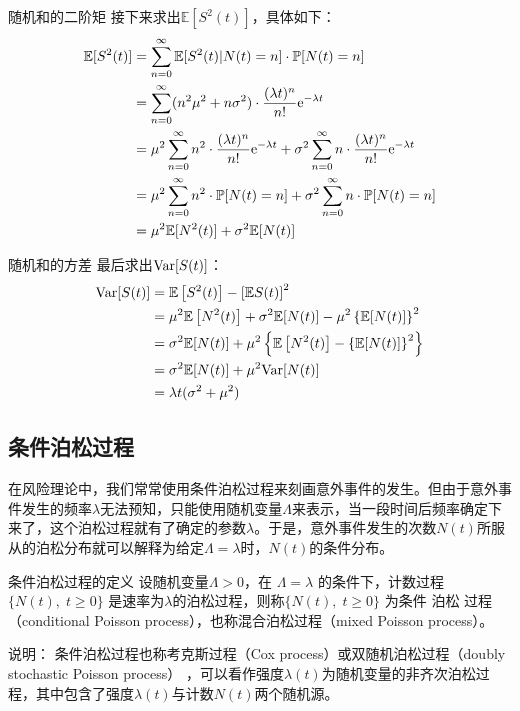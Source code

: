 \documentclass[t]{beamer}
\renewcommand{\Pr}{\mathbb{P}}
\newcommand{\E}{\mathbb{E}}
\newcommand{\Var}{{\rm Var}}
\begin{document}
\begin{frame}{随机和的二阶矩}
    接下来求出$\E[S^2(t)]$，具体如下：
    \[\begin{split}
    \E[S^2(t)]&= \sum^{\infty}_{n=0}\E[S^2(t)|N(t)=n]\cdot \Pr[N(t)=n]\\
    &=  \sum^{\infty}_{n=0}(n^2\mu^2+n\sigma^2)\cdot \frac{(\lambda t)^n}{n!}{\rm e}^{-\lambda t}\\
        &=\mu^2  \sum^{\infty}_{n=0}  n^2\cdot\frac{(\lambda t)^n}{n!}{\rm e}^{-\lambda t}+\sigma^2 \sum^{\infty}_{n=0}  n\cdot\frac{(\lambda t)^n}{n!}{\rm e}^{-\lambda t}  \\
        &=\mu^2  \sum^{\infty}_{n=0}  n^2\cdot \Pr[N(t)=n]   +\sigma^2 \sum^{\infty}_{n=0}  n \cdot \Pr[N(t)=n]   \\
    &=\mu^2 \E[N^2(t)]+\sigma^2 \E[N(t)]
    \end{split} \]
\end{frame}


\begin{frame}{随机和的方差}
    最后求出$\Var[S(t)]$：
    \[\begin{split}
    \Var[S(t)]&= \E\left[S^2(t)\right]-\left[\E S(t) \right]^2\\
    &=\mu^2 \E\left[N^2(t) \right]+\sigma^2 \E[N(t)]-\mu^2 \left\{\E[N(t)] \right\}^2\\
    &=\sigma^2 \E[N(t)]+\mu^2\left\{ \E\left[N^2(t)\right]-\left\{\E[N(t)] \right\}^2 \right\}
    \\
    &=\sigma^2 \E[N(t)]+\mu^2 \Var[N(t)]\\
    &=\lambda t(\sigma^2+\mu^2)
    \end{split} \]  
\end{frame}


\subsection{条件泊松过程}

\begin{frame}{}
在风险理论中，我们常常使用条件泊松过程来刻画意外事件的发生。但由于意外事件发生的频率$\lambda$无法预知，只能使用随机变量$\Lambda$来表示，当一段时间后频率确定下来了，这个泊松过程就有了确定的参数$\lambda$。于是，意外事件发生的次数$N(t)$所服从的泊松分布就可以解释为给定$\Lambda=\lambda$时，$N(t)$的条件分布。
    

\end{frame}

\begin{frame}{条件泊松过程的定义}
    设随机变量$\Lambda > 0$，在 $\Lambda = \lambda$ 的条件下，计数过程 $\{ N ( t ) ,\;  t \ge  0 \}$ 是速率为$\lambda$的泊松过程，则称$\{ N ( t ) ,\;  t \ge  0 \}$ 为条件 泊松 过程（conditional Poisson process），也称混合泊松过程（mixed Poisson process）。
    
\begin{block}{说明：}
    条件泊松过程也称考克斯过程（Cox process）或双随机泊松过程（doubly stochastic Poisson process）
，可以看作强度$\lambda(t)$为随机变量的非齐次泊松过程，其中包含了强度$\lambda(t)$与计数$N(t)$两个随机源。
\end{block}
\end{frame}
\end{document}

